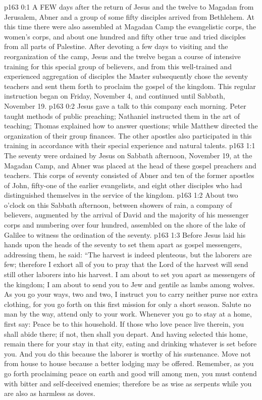 \vs p163 0:1 A FEW days after the return of Jesus and the twelve to Magadan from Jerusalem, Abner and a group of some fifty disciples arrived from Bethlehem. At this time there were also assembled at Magadan Camp the evangelistic corps, the women’s corps, and about one hundred and fifty other true and tried disciples from all parts of Palestine. After devoting a few days to visiting and the reorganization of the camp, Jesus and the twelve began a course of intensive training for this special group of believers, and from this well\hyp{}trained and experienced aggregation of disciples the Master subsequently chose the seventy teachers and sent them forth to proclaim the gospel of the kingdom. This regular instruction began on Friday, November 4, and continued until Sabbath, November 19.
\vs p163 0:2 Jesus gave a talk to this company each morning. Peter taught methods of public preaching; Nathaniel instructed them in the art of teaching; Thomas explained how to answer questions; while Matthew directed the organization of their group finances. The other apostles also participated in this training in accordance with their special experience and natural talents.
\vs p163 1:1 The seventy were ordained by Jesus on Sabbath afternoon, November 19, at the Magadan Camp, and Abner was placed at the head of these gospel preachers and teachers. This corps of seventy consisted of Abner and ten of the former apostles of John, fifty\hyp{}one of the earlier evangelists, and eight other disciples who had distinguished themselves in the service of the kingdom.
\vs p163 1:2 About two o’clock on this Sabbath afternoon, between showers of rain, a company of believers, augmented by the arrival of David and the majority of his messenger corps and numbering over four hundred, assembled on the shore of the lake of Galilee to witness the ordination of the seventy.
\vs p163 1:3 Before Jesus laid his hands upon the heads of the seventy to set them apart as gospel messengers, addressing them, he said: \textcolor{ubdarkred}{“The harvest is indeed plenteous, but the laborers are few; therefore I exhort all of you to pray that the Lord of the harvest will send still other laborers into his harvest. I am about to set you apart as messengers of the kingdom; I am about to send you to Jew and gentile as lambs among wolves. As you go your ways, two and two, I instruct you to carry neither purse nor extra clothing, for you go forth on this first mission for only a short season. Salute no man by the way, attend only to your work. Whenever you go to stay at a home, first say: Peace be to this household. If those who love peace live therein, you shall abide there; if not, then shall you depart. And having selected this home, remain there for your stay in that city, eating and drinking whatever is set before you. And you do this because the laborer is worthy of his sustenance. Move not from house to house because a better lodging may be offered. Remember, as you go forth proclaiming peace on earth and good will among men, you must contend with bitter and self\hyp{}deceived enemies; therefore be as wise as serpents while you are also as harmless as doves.}
